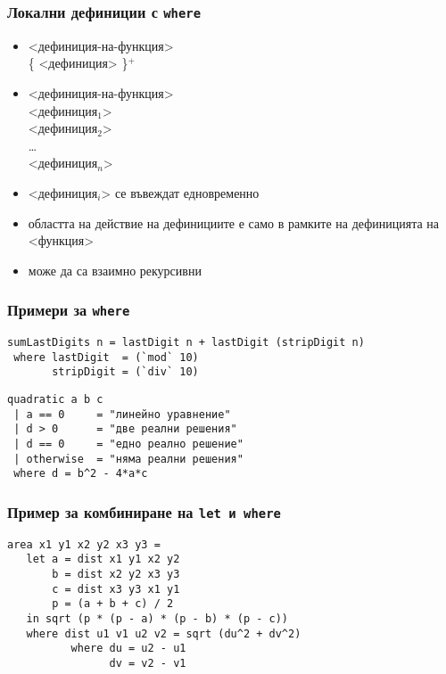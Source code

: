 \documentclass{beamer}
\begin{document}
\begin{frame}
  \frametitle{Локални дефиниции с \tt{where}}
  \begin{itemize}
  \item{} <дефиниция-на-функция>\\
        \hspace{5ex}  \{ <дефиниция> \}$^+$
        \pause
  \item{} <дефиниция-на-функция>\\
        \hspace{5ex}  <дефиниция$_1$>\\
        \hspace{11ex} <дефиниция$_2$>\\
        \hspace{11ex}\ldots\\
        \hspace{11ex} <дефиниция$_n$>\\
        \pause
  \item{} <дефиниция$_i$> се въвеждат едновременно
  \item областта на действие на дефинициите е само в рамките на дефиницията на <функция>
  \item може да са взаимно рекурсивни
  \end{itemize}
\end{frame}

\begin{frame}
  \frametitle{Примери за \tt{where}}
\begin{verbatim}
sumLastDigits n = lastDigit n + lastDigit (stripDigit n)
 where lastDigit  = (`mod` 10)
       stripDigit = (`div` 10)
\end{verbatim}
\pause
\begin{verbatim}
quadratic a b c
 | a == 0     = "линейно уравнение"
 | d > 0      = "две реални решения"
 | d == 0     = "едно реално решение"
 | otherwise  = "няма реални решения"
 where d = b^2 - 4*a*c
\end{verbatim}
\end{frame}

\begin{frame}[fragile]
  \frametitle{Пример за комбиниране на \tt{let} и \tt{where}}
\begin{verbatim}
area x1 y1 x2 y2 x3 y3 =
   let a = dist x1 y1 x2 y2
       b = dist x2 y2 x3 y3
       c = dist x3 y3 x1 y1
       p = (a + b + c) / 2
   in sqrt (p * (p - a) * (p - b) * (p - c))
   where dist u1 v1 u2 v2 = sqrt (du^2 + dv^2)
          where du = u2 - u1
                dv = v2 - v1
\end{verbatim}
\end{frame}
\end{document}
